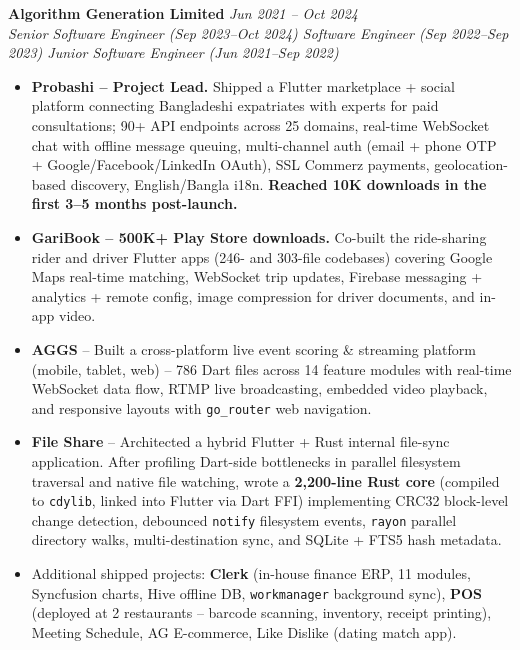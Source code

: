 \documentclass[a4paper,10pt]{article}
\begin{document}
\vspace{1.5mm}
\noindent\textbf{Algorithm Generation Limited} \hfill \textit{Jun 2021 -- Oct 2024}\\
\textit{Senior Software Engineer (Sep 2023--Oct 2024) \textbar{} Software Engineer (Sep 2022--Sep 2023) \textbar{} Junior Software Engineer (Jun 2021--Sep 2022)}
\begin{itemize}[leftmargin=*, noitemsep, topsep=2pt, parsep=0pt, partopsep=0pt]
    \item \textbf{Probashi -- Project Lead.} Shipped a Flutter marketplace + social platform connecting Bangladeshi expatriates with experts for paid consultations; 90+ API endpoints across 25 domains, real-time WebSocket chat with offline message queuing, multi-channel auth (email + phone OTP + Google/Facebook/LinkedIn OAuth), SSL Commerz payments, geolocation-based discovery, English/Bangla i18n. \textbf{Reached 10K downloads in the first 3--5 months post-launch.}
    \item \textbf{GariBook -- 500K+ Play Store downloads.} Co-built the ride-sharing rider and driver Flutter apps (246- and 303-file codebases) covering Google Maps real-time matching, WebSocket trip updates, Firebase messaging + analytics + remote config, image compression for driver documents, and in-app video.
    \item \textbf{AGGS} -- Built a cross-platform live event scoring \& streaming platform (mobile, tablet, web) -- 786 Dart files across 14 feature modules with real-time WebSocket data flow, RTMP live broadcasting, embedded video playback, and responsive layouts with \texttt{go\_router} web navigation.
    \item \textbf{File Share} -- Architected a hybrid Flutter + Rust internal file-sync application. After profiling Dart-side bottlenecks in parallel filesystem traversal and native file watching, wrote a \textbf{2{,}200-line Rust core} (compiled to \texttt{cdylib}, linked into Flutter via Dart FFI) implementing CRC32 block-level change detection, debounced \texttt{notify} filesystem events, \texttt{rayon} parallel directory walks, multi-destination sync, and SQLite + FTS5 hash metadata.
    \item Additional shipped projects: \textbf{Clerk} (in-house finance ERP, 11 modules, Syncfusion charts, Hive offline DB, \texttt{workmanager} background sync), \textbf{POS} (deployed at 2 restaurants -- barcode scanning, inventory, receipt printing), Meeting Schedule, AG E-commerce, Like Dislike (dating match app).
\end{itemize}
\end{document}

